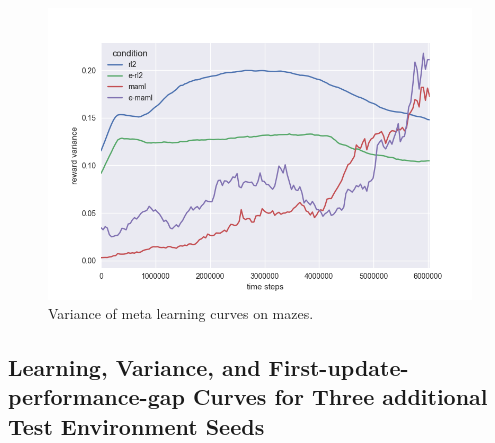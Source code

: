 \documentclass{article} %
\begin{document}
\begin{figure}[H]
\begin{center}
\includegraphics[scale=0.4]{bradly_curves/var_mazes.png} 
\end{center}
\caption{Variance of meta learning curves on mazes.}
\label{fig:varmazes0}
\end{figure}

\subsection{Learning, Variance, and First-update-performance-gap Curves for Three additional Test Environment Seeds}
\end{document}
